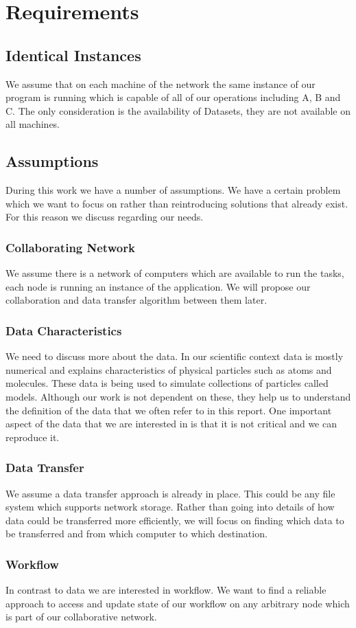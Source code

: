 \chapter{Requirements}
\label{cha:requirements}

\section{Identical Instances}
We assume that on each machine of the network the same instance of our program is running which 
is capable of all of our operations
including A, B and C. The only consideration is the availability of 
Datasets, they are not available on all machines.

\section{Assumptions}
During this work we have a number of assumptions. We have a certain problem which we want to focus
on rather than reintroducing solutions that already exist. For this reason we discuss regarding our 
needs.

\subsection{Collaborating Network}
We assume there is a network of computers which are available to run the tasks, each node is running an instance
of the application. We will propose our collaboration and data transfer algorithm between them later.

\subsection{Data Characteristics}
We need to discuss more about the data. In our scientific context data is mostly numerical and explains characteristics
of physical particles such as atoms and molecules. These data is being used to simulate collections of particles called
models. Although our work is not dependent on these, they help us to understand the definition of the data that
we often refer to in this report. One important aspect of the data that we are interested in is that it is not critical 
and we can reproduce it. 

\subsection{Data Transfer}
We assume a data transfer approach is already in place. This could be any file system which supports 
network storage. Rather than going into details of how data could be transferred more efficiently, we will
focus on finding which data to be transferred and from which computer to which destination.

\subsection{Workflow}
In contrast to data we are interested in workflow. We want to find a reliable approach to access and update 
state of our workflow on any arbitrary node which is part of our collaborative network.

